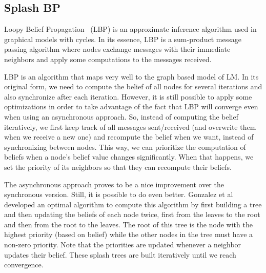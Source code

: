 \subsection{Splash BP}

Loopy Belief Propagation~\cite{Murphy99loopybelief} (LBP) is an approximate inference algorithm
used in graphical models with cycles. In its essence, LBP is a sum-product message passing algorithm
where nodes exchange messages with their immediate neighbors and apply some computations to the messages
received.

LBP is an algorithm that maps very well to the graph based model of LM. In its original form, we need to compute
the belief of all nodes for several iterations and also synchronize after each iteration.
However, it is still possible to apply
some optimizations in order to take advantage of the fact that LBP will converge even when using
an asynchronous approach. So, instead of computing the belief iteratively,
we first keep track of all messages sent/received (and overwrite them when we receive a new one)
and recompute the belief when we want, instead of synchronizing between nodes.
This way, we can prioritize the computation of beliefs when
a node's belief value changes significantly. When that happens, we set the priority of its
neighbors so that they can recompute their beliefs.

The asynchronous approach proves to be a nice improvement over the synchronous version. Still, it
is possible to do even better. Gonzalez et al~\cite{Gonzalez+al:aistats09paraml} developed an optimal
algorithm to compute this algorithm by first building a tree and then updating the beliefs of each node twice, first from the leaves to the root and then from the root to the leaves. The root of this tree
is the node with the highest priority (based on belief) while the other nodes in the tree
must have a non-zero priority. Note that the priorities are updated whenever a neighbor updates
their belief. These splash trees are built iteratively until we reach convergence.


